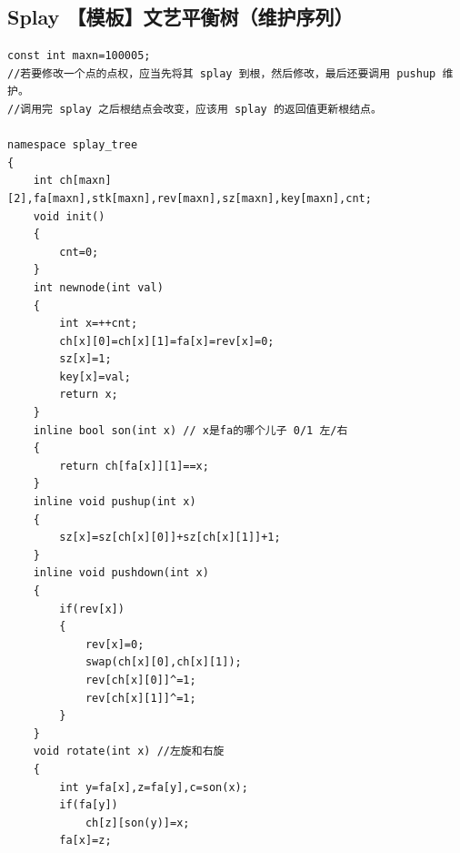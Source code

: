 \subsection{Splay 【模板】文艺平衡树（维护序列）}
\begin{verbatim}
const int maxn=100005;
//若要修改一个点的点权，应当先将其 splay 到根，然后修改，最后还要调用 pushup 维护。
//调用完 splay 之后根结点会改变，应该用 splay 的返回值更新根结点。

namespace splay_tree
{
    int ch[maxn][2],fa[maxn],stk[maxn],rev[maxn],sz[maxn],key[maxn],cnt;
    void init()
    {
        cnt=0;
    }
    int newnode(int val)
    {
        int x=++cnt;
        ch[x][0]=ch[x][1]=fa[x]=rev[x]=0;
        sz[x]=1;
        key[x]=val;
        return x;
    }
    inline bool son(int x) // x是fa的哪个儿子 0/1 左/右
    {
        return ch[fa[x]][1]==x;
    }
    inline void pushup(int x)
    {
        sz[x]=sz[ch[x][0]]+sz[ch[x][1]]+1;
    }
    inline void pushdown(int x)
    {
        if(rev[x])
        {
            rev[x]=0;
            swap(ch[x][0],ch[x][1]);
            rev[ch[x][0]]^=1;
            rev[ch[x][1]]^=1; 
        }
    }
    void rotate(int x) //左旋和右旋
    {
        int y=fa[x],z=fa[y],c=son(x);
        if(fa[y])
            ch[z][son(y)]=x;
        fa[x]=z;
        

\end{verbatim}
